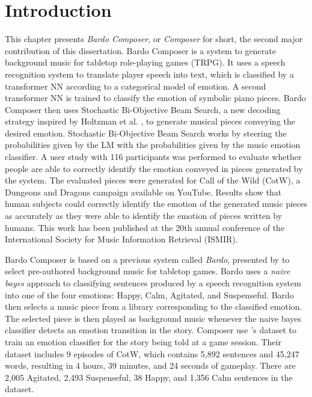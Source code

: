 \section{Introduction}

This chapter presents \textit{Bardo Composer}, or \textit{Composer} for short, the second major contribution of this dissertation. Bardo Composer is a system to generate background music for tabletop role-playing games (TRPG). It uses a speech recognition system to translate player speech into text, which is classified by a transformer NN according to a categorical model of emotion. A second transformer NN is trained to classify the emotion of symbolic piano pieces. Bardo Composer then uses Stochastic Bi-Objective Beam Search, a new decoding strategy inspired by Holtzman et al. \cite{holtzman2018learning}, to generate musical pieces conveying the desired emotion. Stochastic Bi-Objective Beam Search works by steering the probabilities given by the LM with the probabilities given by the music emotion classifier. A user study with 116 participants was performed to evaluate whether people are able to correctly identify the emotion conveyed in pieces generated by the system. The evaluated pieces were generated for Call of the Wild (CotW), a Dungeons and Dragons campaign available on YouTube. Results show that human subjects could correctly identify the emotion of the generated music pieces as accurately as they were able to identify the emotion of pieces written by humans. This work has been published at the 20th annual conference of the International Society for Music Information Retrieval (ISMIR).

Bardo Composer is based on a previous system called \textit{Bardo}, presented by \citet{padovani2017} to select pre-authored background music for tabletop games. Bardo uses a \textit{naive bayes} approach to classifying sentences produced by a speech recognition system into one of the four emotions: Happy, Calm, Agitated, and Suspenseful. Bardo then selects a music piece from a library corresponding to the classified emotion. The selected piece is then played as background music whenever the naive bayes classifier detects an emotion transition in the story. Composer use \citet{padovani2017}'s dataset to train an emotion classifier for the story being told at a game session. Their dataset includes 9 episodes of CotW, which contains 5,892 sentences and 45,247 words, resulting in 4 hours, 39 minutes, and 24 seconds of gameplay. There are 2,005 Agitated, 2,493 Suspenseful, 38 Happy, and 1,356 Calm sentences in the dataset.

